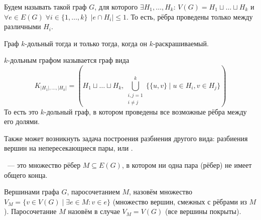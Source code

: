 \begin{definition}
    Будем называть  такой граф $ G $, для которого $ \exists H_1, \ldots, H_k $:
    $ V(G) = H_1 \sqcup \ldots \sqcup H_k $ и $ \forall e \in E(G) \; \forall i \in \{1, \ldots, k\} \;\, | e \cap H_i | \leqslant 1 $.
    То есть, рёбра проведены только между различными  $ H_i $.
\end{definition}

\begin{remark}
    Граф $ k $-дольный тогда и только тогда, когда он $ k $-раскрашиваемый.
\end{remark}

\begin{definition}
     $ k $-дольным графом называется граф вида
    \[
        K_{|H_1|, \ldots, |H_k|} = \left( H_1 \sqcup \ldots \sqcup H_k, \bigcup_{\substack{i,j = 1 \\ i \neq j}}^k \big\{ \{u, v\} \mid u \in H_i, v \in H_j \big\} \right)
    \]
    То есть это $ k $-дольный граф, в котором проведены все возможные рёбра между его долями.
\end{definition}


Также может возникнуть задача построения разбиения другого вида: разбиения вершин на непересекающиеся пары, или .

\begin{definition}
    ~--- это множество рёбер $ M \subseteq E(G) $, в котором ни одна пара (рёбер) не имеет общего конца.
\end{definition}

\begin{definition}
    Вершинами графа $ G $,  паросочетанием $ M $, назовём множество $ V_M = \{ v \in V(G) \mid \exists e \in M: v \in e \} $
    (множество вершин, смежных с рёбрами из $ M $).
    \newline
    Паросочетание $ M $ назовём  в случае $ V_M = V(G) $ (все вершины покрыты).
\end{definition}


